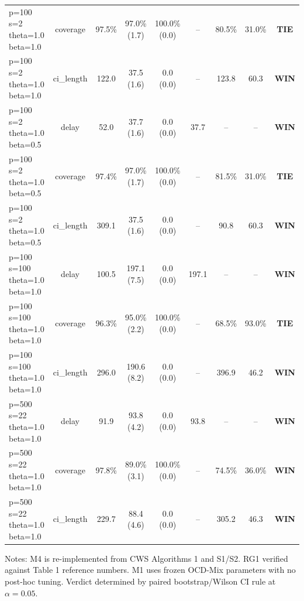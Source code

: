 \begin{table}[t]
\begin{small}
\begin{tabular}{lcccccccc}
p=100 s=2 theta=1.0 beta=1.0 & coverage & 97.5\% & 97.0\% (1.7) & 100.0\% (0.0) & -- & 80.5\% & 31.0\% & \textbf{TIE} \\
p=100 s=2 theta=1.0 beta=1.0 & ci_length & 122.0 & 37.5 (1.6) & 0.0 (0.0) & -- & 123.8 & 60.3 & \textbf{WIN} \\
\midrule
p=100 s=2 theta=1.0 beta=0.5 & delay & 52.0 & 37.7 (1.6) & 0.0 (0.0) & 37.7 & -- & -- & \textbf{WIN} \\
p=100 s=2 theta=1.0 beta=0.5 & coverage & 97.4\% & 97.0\% (1.7) & 100.0\% (0.0) & -- & 81.5\% & 31.0\% & \textbf{TIE} \\
p=100 s=2 theta=1.0 beta=0.5 & ci_length & 309.1 & 37.5 (1.6) & 0.0 (0.0) & -- & 90.8 & 60.3 & \textbf{WIN} \\
\midrule
p=100 s=100 theta=1.0 beta=1.0 & delay & 100.5 & 197.1 (7.5) & 0.0 (0.0) & 197.1 & -- & -- & \textbf{WIN} \\
p=100 s=100 theta=1.0 beta=1.0 & coverage & 96.3\% & 95.0\% (2.2) & 100.0\% (0.0) & -- & 68.5\% & 93.0\% & \textbf{TIE} \\
p=100 s=100 theta=1.0 beta=1.0 & ci_length & 296.0 & 190.6 (8.2) & 0.0 (0.0) & -- & 396.9 & 46.2 & \textbf{WIN} \\
\midrule
p=500 s=22 theta=1.0 beta=1.0 & delay & 91.9 & 93.8 (4.2) & 0.0 (0.0) & 93.8 & -- & -- & \textbf{WIN} \\
p=500 s=22 theta=1.0 beta=1.0 & coverage & 97.8\% & 89.0\% (3.1) & 100.0\% (0.0) & -- & 74.5\% & 36.0\% & \textbf{WIN} \\
p=500 s=22 theta=1.0 beta=1.0 & ci_length & 229.7 & 88.4 (4.6) & 0.0 (0.0) & -- & 305.2 & 46.3 & \textbf{WIN} \\
\midrule
\bottomrule
\end{tabular}
\end{small}
\par\vspace{1ex}\raggedright\footnotesize{Notes: M4 is re-implemented from CWS Algorithms 1 and S1/S2. RG1 verified against Table 1 reference numbers. M1 uses frozen OCD-Mix parameters with no post-hoc tuning. Verdict determined by paired bootstrap/Wilson CI rule at $\alpha=0.05$.}
\end{table}